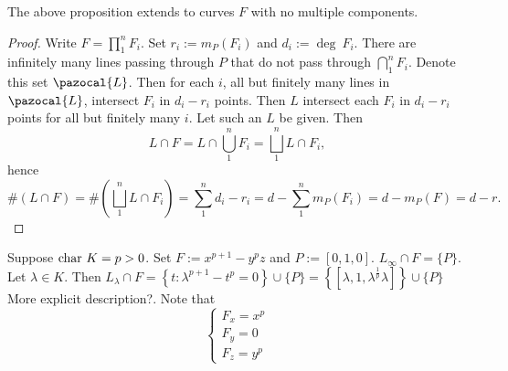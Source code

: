      \begin{proposition}
         The above proposition extends to curves $F$ with no multiple components.
     \end{proposition}
     \begin{proof}
         Write $F=\prod_1^n F_i$. Set $r_i := m_P(F_i)$ and $d_i:= \deg \ F_i$. There are infinitely many lines passing through $P$ that do not pass through $\bigcap_1^n F_i$. Denote this set $\pazocal{L}$. Then for each $i$, all but finitely many lines in $\pazocal{L}$, intersect $F_i$ in $d_i-r_i$ points. Then $L$ intersect each $F_i$ in $d_i-r_i$ points for all but finitely many $i$. Let such an $L$ be given. Then  
         $$L\cap F = L \cap \bigcup_1^n F_i = \bigsqcup_1^n L\cap F_i,$$
         hence 
         $$\#(L\cap F) = \#\left(\bigsqcup_1^n L\cap F_i\right) = \sum_1^n d_i-r_i= d -\sum_1^n m_P(F_i)=d-m_P(F)=d-r.$$
    \end{proof}
    \begin{example}
        Suppose $\mathrm{char} \ K = p >0$. Set $F:=x^{p+1}-y^pz$ and $P:= [0,1,0]$. $L_\infty \cap F = \{P\}$. Let $\lambda \in K$. Then $L_\lambda \cap F= \left\{t : \lambda^{p+1} -t^{p}=0\right\}\cup \{P\} =\left\{ \left[\lambda , 1, \lambda^{\frac{1}{p}}{\lambda}\right]\right\}\cup \{P\}$ {\Large More explicit description?}. Note that 
        $$\begin{cases}
            F_x = x^p\\
            F_y = 0\\
            F_z = y^p
        \end{cases}$$
    \end{example}
